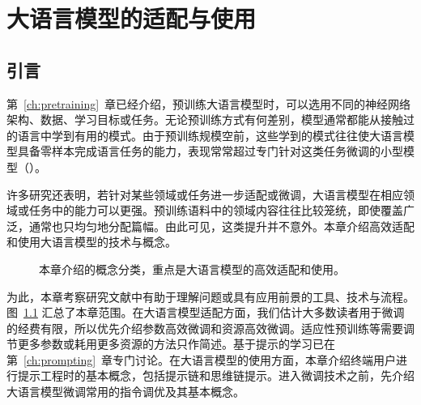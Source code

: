 \chapter{大语言模型的适配与使用}
\label{ch:adaptation}

\section{引言}
第~\ref{ch:pretraining}~章已经介绍，预训练大语言模型时，可以选用不同的神经网络架构、数据、学习目标或任务。无论预训练方式有何差别，模型通常都能从接触过的语言中学到有用的模式。由于预训练规模空前，这些学到的模式往往使大语言模型具备零样本完成语言任务的能力，表现常常超过专门针对这类任务微调的小型模型（）。

许多研究还表明，若针对某些领域或任务进一步适配或微调，大语言模型在相应领域或任务中的能力可以更强。预训练语料中的领域内容往往比较笼统，即使覆盖广泛，通常也只均匀地分配篇幅。由此可见，这类提升并不意外。本章介绍高效适配和使用大语言模型的技术与概念。

\begin{figure}[!htbp]
\centering

\caption{本章介绍的概念分类，重点是大语言模型的高效适配和使用。}
\label{fig:ch04-taxonomy}
\end{figure}

为此，本章考察研究文献中有助于理解问题或具有应用前景的工具、技术与流程。图~\ref{fig:ch04-taxonomy} 汇总了本章范围。在大语言模型适配方面，我们估计大多数读者用于微调的经费有限，所以优先介绍参数高效微调和资源高效微调。适应性预训练等需要调节更多参数或耗用更多资源的方法只作简述。基于提示的学习已在第~\ref{ch:prompting}~章专门讨论。在大语言模型的使用方面，本章介绍终端用户进行提示工程时的基本概念，包括提示链和思维链提示。进入微调技术之前，先介绍大语言模型微调常用的指令调优及其基本概念。







